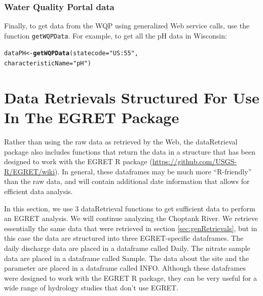 \documentclass[a4paper,11pt]{article}\usepackage[]{graphicx}\usepackage[]{color}
\makeatletter
\newcommand{\hlstr}[1]{\textcolor[rgb]{0.192,0.494,0.8}{#1}}%
\newcommand{\hlstd}[1]{\textcolor[rgb]{0.345,0.345,0.345}{#1}}%
\newcommand{\hlkwb}[1]{\textcolor[rgb]{0.69,0.353,0.396}{#1}}%
\newcommand{\hlkwc}[1]{\textcolor[rgb]{0.333,0.667,0.333}{#1}}%
\newcommand{\hlkwd}[1]{\textcolor[rgb]{0.737,0.353,0.396}{\textbf{#1}}}%
\newenvironment{kframe}{%
 \def\at@end@of@kframe{}%
 \ifinner\ifhmode%
  \def\at@end@of@kframe{\end{minipage}}%
  \begin{minipage}{\columnwidth}%
 \fi\fi%
 \def\FrameCommand##1{\hskip\@totalleftmargin \hskip-\fboxsep
 \colorbox{shadecolor}{##1}\hskip-\fboxsep
     \hskip-\linewidth \hskip-\@totalleftmargin \hskip\columnwidth}%
 \MakeFramed {\advance\hsize-\width
   \@totalleftmargin\z@ \linewidth\hsize
   \@setminipage}}%
 {\par\unskip\endMakeFramed%
 \at@end@of@kframe}
\newenvironment{knitrout}{}{} %
\makeatother
\begin{document}
\subsubsection{Water Quality Portal data}
\label{sec:WQPGenData}
Finally, to get data from the WQP using generalized Web service calls, use the function \texttt{getWQPData}. For example, to get all the pH data in Wisconsin:

\begin{knitrout}
\color{fgcolor}\begin{kframe}
\begin{alltt}
\hlstd{dataPH} \hlkwb{<-} \hlkwd{getWQPData}\hlstd{(}\hlkwc{statecode}\hlstd{=}\hlstr{"US:55"}\hlstd{,}
                 \hlkwc{characteristicName}\hlstd{=}\hlstr{"pH"}\hlstd{)}
\end{alltt}
\end{kframe}
\end{knitrout}



\FloatBarrier

\section{Data Retrievals Structured For Use In The EGRET Package}
\label{sec:EGRETdfs}
Rather than using the raw data as retrieved by the Web, the dataRetrieval package also includes functions that return the data in a structure that has been designed to work with the EGRET R package (\url{https://github.com/USGS-R/EGRET/wiki}). In general, these dataframes may be much more \enquote{R-friendly} than the raw data, and will contain additional date information that allows for efficient data analysis.

In this section, we use 3 dataRetrieval functions to get sufficient data to perform an EGRET analysis.  We will continue analyzing the Choptank River. We retrieve essentially the same data that were retrieved in section \ref{sec:genRetrievals}, but in this case the data are structured into three EGRET-specific dataframes.  The daily discharge data are placed in a dataframe called Daily.  The nitrate sample data are placed in a dataframe called Sample.  The data about the site and the parameter are placed in a dataframe called INFO.  Although these dataframes were designed to work with the EGRET R package, they can be very useful for a wide range of hydrology studies that don't use EGRET.
\end{document}

